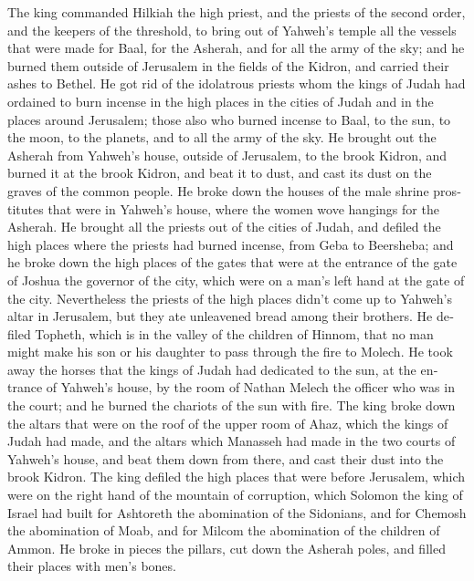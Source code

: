 \begin{paracol}{2}
\begin{otherlanguage}{english}
 The king commanded Hilkiah the high priest, and the
priests of the second order, and the keepers of the threshold, to bring
out of Yahweh's temple all the vessels that were made for Baal, for the
Asherah, and for all the army of the sky; and he burned them outside of
Jerusalem in the fields of the Kidron, and carried their ashes to
Bethel.  He got rid of the idolatrous priests whom the
kings of Judah had ordained to burn incense in the high places in the
cities of Judah and in the places around Jerusalem; those also who
burned incense to Baal, to the sun, to the moon, to the planets, and to
all the army of the sky.  He brought out the Asherah from
Yahweh's house, outside of Jerusalem, to the brook Kidron, and burned it
at the brook Kidron, and beat it to dust, and cast its dust on the
graves of the common people.  He broke down the houses of
the male shrine prostitutes that were in Yahweh's house, where the women
wove hangings for the Asherah.  He brought all the priests
out of the cities of Judah, and defiled the high places where the
priests had burned incense, from Geba to Beersheba; and he broke down
the high places of the gates that were at the entrance of the gate of
Joshua the governor of the city, which were on a man's left hand at the
gate of the city.  Nevertheless the priests of the high
places didn't come up to Yahweh's altar in Jerusalem, but they ate
unleavened bread among their brothers.  He defiled
Topheth, which is in the valley of the children of Hinnom, that no man
might make his son or his daughter to pass through the fire to Molech.
 He took away the horses that the kings of Judah had
dedicated to the sun, at the entrance of Yahweh's house, by the room of
Nathan Melech the officer who was in the court; and he burned the
chariots of the sun with fire.  The king broke down the
altars that were on the roof of the upper room of Ahaz, which the kings
of Judah had made, and the altars which Manasseh had made in the two
courts of Yahweh's house, and beat them down from there, and cast their
dust into the brook Kidron.  The king defiled the high
places that were before Jerusalem, which were on the right hand of the
mountain of corruption, which Solomon the king of Israel had built for
Ashtoreth the abomination of the Sidonians, and for Chemosh the
abomination of Moab, and for Milcom the abomination of the children of
Ammon.  He broke in pieces the pillars, cut down the
Asherah poles, and filled their places with men's bones.


\end{otherlanguage}
\end{paracol}
